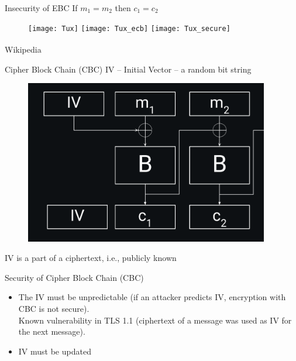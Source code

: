 \documentclass[usenames,dvipsnames, 9pt]{beamer}
\begin{document}
\begin{frame}{Insecurity of EBC}
\centering
\Huge If $m_1 = m_2$ then $c_1 = c_2$ \\[20pt]
\large
\begin{figure}
	\texttt{[image: Tux]} \quad 
	\texttt{[image: Tux\_ecb]} \quad 
	\texttt{[image: Tux\_secure]}
\end{figure}

\vfill
\small
{\color{gray} \textsuperscript{\textcopyright} Wikipedia} 
\end{frame}

\begin{frame}{Cipher Block Chain (CBC)}
\Large
{\color{Orange} IV} -- Initial Vector -- a random bit string

\begin{figure}
	\includegraphics[width=0.95\textwidth]{CBC}
\end{figure}
IV is a part of a ciphertext, i.e., publicly known
\end{frame}

\begin{frame}{Security of Cipher Block Chain (CBC)}
\Large
\begin{itemize}
\item The IV must be {\color{Orange} unpredictable} (if an attacker predicts IV, encryption with CBC is not secure).\\ 
Known vulnerability in TLS 1.1 (ciphertext of a message was used as IV for the next message). 
\pause 
\item{\color{Orange} IV must be updated}  \\

\end{itemize}
\end{frame}
\end{document}
